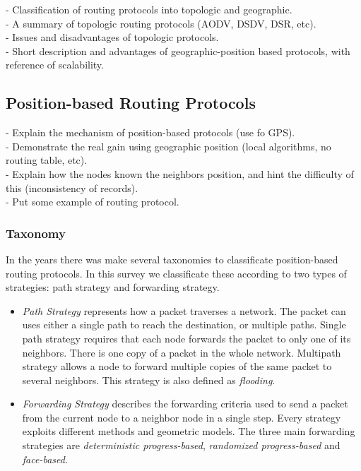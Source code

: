 \documentclass[journal,comsoc]{IEEEtran}
\begin{document}
- Classification of routing protocols into topologic and geographic.\\
- A summary of topologic routing protocols (AODV, DSDV, DSR, etc).\\
- Issues and disadvantages of topologic protocols.\\
- Short description and advantages of geographic-position based protocols, with reference of scalability.\\

\subsection{Position-based Routing Protocols}
- Explain the mechanism of position-based protocols (use fo GPS).\\
- Demonstrate the real gain using geographic position (local algorithms, no routing table, etc).\\
- Explain how the nodes known the neighbors position, and hint the difficulty of this (inconsistency of records).\\
- Put some example of routing protocol.\\
\subsubsection{Taxonomy}
In the years there was make several taxonomies to classificate position-based routing protocols. In this survey we classificate these according to two types of strategies: path strategy and forwarding strategy.
\begin{itemize}
\item \textit{Path Strategy} represents how a packet traverses a network. The packet can uses either a single path to reach the destination, or multiple paths. Single path strategy requires that each node forwards the packet to only one of its neighbors. There is one copy of a packet in the whole network. Multipath strategy allows a node to forward multiple copies of the same packet to several neighbors. This strategy is also defined as \textit{flooding}.
\item \textit{Forwarding Strategy} describes the forwarding criteria used to send a packet from the current node to a neighbor node in a single step. Every strategy exploits different methods and geometric models. The three main forwarding strategies are \textit{deterministic progress-based}, \textit{randomized progress-based} and \textit{face-based}.
\end{itemize}
\end{document}
